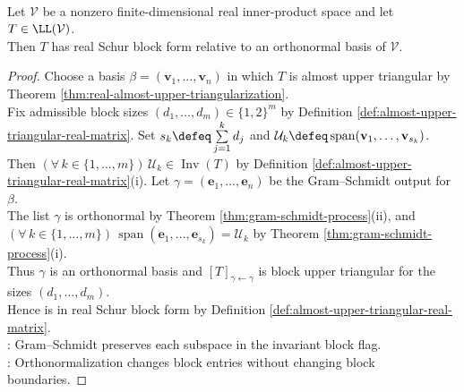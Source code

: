 \begin{corollary} \label{cor:real-schur-block-form-orthonormal} \\
Let $\mathcal{V}$ be a nonzero finite-dimensional real inner-product space and let $T\in\LL(\mathcal{V})$.\\
Then $T$ has real Schur block form relative to an orthonormal basis of $\mathcal{V}$.
\begin{proof}
Choose a basis $\beta=(\mathbf{v}_1,\ldots,\mathbf{v}_n)$ in which $T$ is almost upper triangular by Theorem \ref{thm:real-almost-upper-triangularization}.\\
Fix admissible block sizes $(d_1,\ldots,d_m)\in\{1,2\}^m$ by Definition \ref{def:almost-upper-triangular-real-matrix}. Set $s_k\defeq\sum\limits_{j=1}^{k}d_j$ and $\mathcal{U}_k\defeq\operatorname{span}(\mathbf{v}_1,\ldots,\mathbf{v}_{s_k})$.\\
Then $(\forall\,k\in\{1,\ldots,m\})\,\mathcal{U}_k\in\operatorname{Inv}(T)$ by Definition \ref{def:almost-upper-triangular-real-matrix}(i). Let $\gamma=(\mathbf{e}_1,\ldots,\mathbf{e}_n)$ be the Gram--Schmidt output for $\beta$.\\
The list $\gamma$ is orthonormal by Theorem \ref{thm:gram-schmidt-process}(ii), and $(\forall\,k\in\{1,\ldots,m\})\,\operatorname{span}(\mathbf{e}_1,\ldots,\mathbf{e}_{s_k})=\mathcal{U}_k$ by Theorem \ref{thm:gram-schmidt-process}(i).\\
Thus $\gamma$ is an orthonormal basis and $[T]_{\gamma\leftarrow\gamma}$ is block upper triangular for the sizes $(d_1,\ldots,d_m)$.\\
Hence is in real Schur block form by Definition \ref{def:almost-upper-triangular-real-matrix}.\\
: Gram--Schmidt preserves each subspace in the invariant block flag.\\
: Orthonormalization changes block entries without changing block boundaries.
\end{proof}
\end{corollary}

